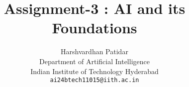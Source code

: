 \documentclass{article}
\title{Assignment-3 : AI and its Foundations}
\author{Harshvardhan Patidar\\
  Department of Artificial Intelligence\\
  Indian Institute of Technology Hyderabad\\
  \texttt{ai24btech11015@iith.ac.in}
}
\begin{document}
\



\maketitle






















\end{document}

